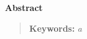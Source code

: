 \thispagestyle{empty} 

\begin{latin}
\centerline{\textbf{\large{Abstract}}}
\begin{quote}
	
\vskip 1cm
\textbf{Keywords:} \textit{a}
\end{quote}
\end{latin}

